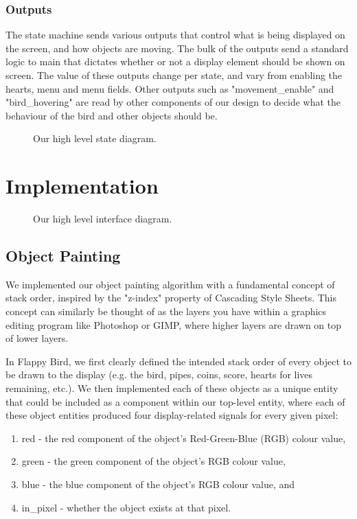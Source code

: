 \documentclass[conference]{IEEEtran}
\begin{document}
\subsubsection{Outputs}
The state machine sends various outputs that control what is being displayed on the screen, and how objects are moving. The bulk of the outputs send a standard logic to main that dictates whether or not a display element should be shown on screen. The value of these outputs change per state, and vary from enabling the hearts, menu and menu fields. Other outputs such as "movement\_enable" and "bird\_hovering" are read by other components of our design to decide what the behaviour of the bird and other objects should be.

\begin{figure}[htbp]
	\caption{Our high level state diagram.}
	\label{fig:fsm}
\end{figure}

\section{Implementation}
\begin{figure}[htbp]
	\caption{Our high level interface diagram.}
	\label{fig:interfaces}
\end{figure}

\subsection{Object Painting}
We implemented our object painting algorithm with a fundamental concept of stack order, inspired by the "z-index" property of Cascading Style Sheets. This concept can similarly be thought of as the layers you have within a graphics editing program like Photoshop or GIMP, where higher layers are drawn on top of lower layers.

In Flappy Bird, we first clearly defined the intended stack order of every object to be drawn to the display (e.g. the bird, pipes, coins, score, hearts for lives remaining, etc.). We then implemented each of these objects as a unique entity that could be included as a component within our top-level entity, where each of these object entities produced four display-related signals for every given pixel:
\begin{enumerate}
	\item red - the red component of the object's Red-Green-Blue (RGB) colour value,
	\item green - the green component of the object's RGB colour value,
	\item blue - the blue component of the object's RGB colour value, and
	\item in\_pixel - whether the object exists at that pixel.
\end{enumerate}
\end{document}
